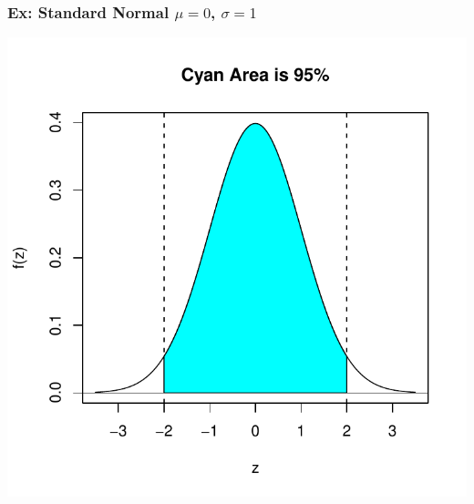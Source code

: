 \documentclass[slides]{beamer}
\begin{document}
\begin{frame}
\frametitle{Ex: Standard Normal $\mu=0$, $\sigma=1$}
\begin{center}
\includegraphics{figure/lec07-002}
\end{center}
\end{frame}
\end{document}

